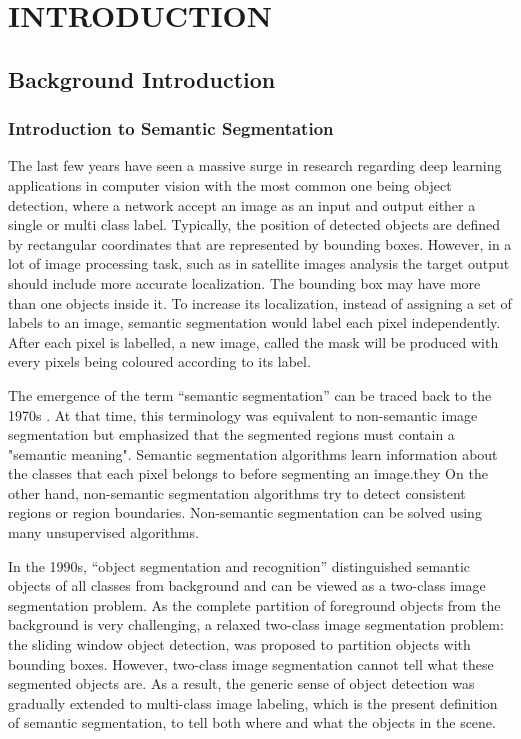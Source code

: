 \chapter{INTRODUCTION}
\section{Background Introduction}

\subsection{Introduction to Semantic Segmentation}

The last few years have seen a massive surge in research regarding deep learning applications in computer vision with the most common one being object detection, where a network accept an image as an input and output either a single or multi class label. Typically, the position of detected objects are defined by rectangular coordinates that are represented by bounding boxes. However, in a lot of image processing task, such as in satellite images analysis the target output should include more accurate localization. The bounding box may have more than one objects inside it. To increase its localization, instead of assigning a set of labels to an image, semantic segmentation would label each pixel independently. After each pixel is labelled, a new image, called the mask  will be produced with every pixels being coloured according to its label.

The emergence of the term “semantic segmentation” can be traced back to the 1970s \cite{YU201882}. At that time, this terminology was equivalent to non-semantic image segmentation but emphasized that the segmented regions must contain a "semantic meaning". Semantic segmentation algorithms learn information about the classes that each pixel belongs to before segmenting an image.they On the other hand, non-semantic segmentation algorithms try to detect consistent regions or region boundaries. Non-semantic segmentation can be solved using many unsupervised algorithms. 

In the 1990s, “object segmentation and recognition”  distinguished semantic objects of all classes from background and can be viewed as a two-class image segmentation problem. As the complete partition of foreground objects from the background is very challenging, a relaxed two-class image segmentation problem: the sliding window object detection, was proposed to partition objects with bounding boxes. However, two-class image segmentation cannot tell what these segmented objects are. As a result, the generic sense of object detection was gradually extended to multi-class image labeling, which is the present definition of semantic segmentation, to tell both where and what the objects in the scene.

